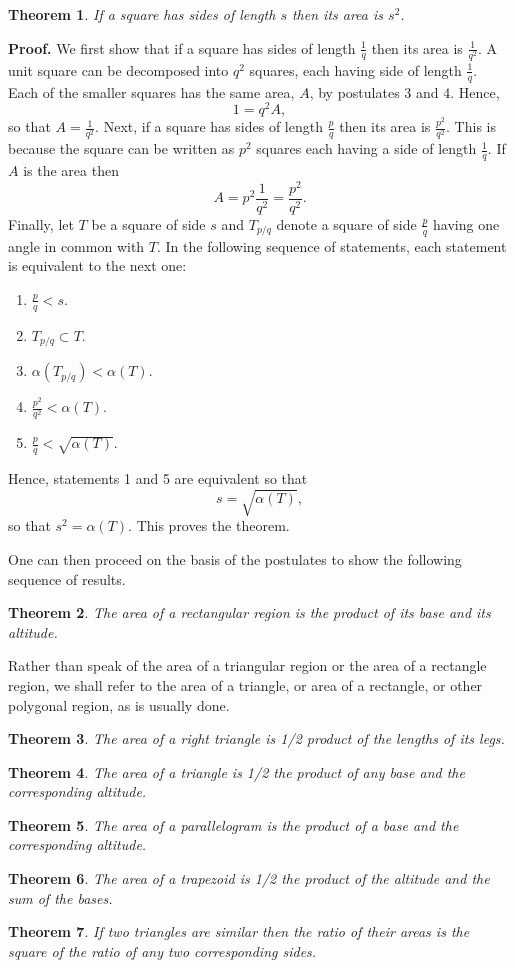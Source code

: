 \documentclass[12pt]{article}
\newtheorem{thm}{Theorem}
\begin{document}
\begin{thm}
If a square has sides of length $s$ then its area is $s^2$.
\end{thm}
\textbf{Proof.} We first show that if a square has sides of length $\frac{1}{q}$ then its area is
$\frac{1}{q^2}$. A unit square can be decomposed into $q^2$ squares, each having side of length
$\frac{1}{q}$. Each of the smaller squares has the same area, $A$,  by postulates 3 and 4. 
Hence,
$$
1 = q^2 A,
$$
so that $A = \frac{1}{q^2}$. Next, if a square has sides of length $\frac{p}{q}$ then its area
is $\frac{p^2}{q^2}$. This is because the square can be written as $p^2$ squares each having a side of length
$\frac{1}{q}$.  If $A$ is the area then
$$
A = p^2 \frac{1}{q^2} = \frac{p^2}{q^2}.
$$
Finally, let $T$ be a square of side $s$ and $T_{p/q}$ denote a square of side $\frac{p}{q}$ having
one angle in common with $T$. In the following sequence of statements, each statement 
is equivalent to the next one:
\begin{enumerate}
\item $\frac{p}{q} < s.$
\item $T_{p/q} \subset T.$ 
\item $\alpha(T_{p/q}) < \alpha(T).$
\item $\frac{p^2}{q^2} < \alpha(T).$
\item $\frac{p}{q} < \sqrt{\alpha(T)}.$
\end{enumerate}
 
Hence, statements 1 and 5 are equivalent so that 
$$
s = \sqrt{\alpha(T)},
$$
so that $s^2 = \alpha(T)$.
This proves the theorem.

One can then proceed on the basis of the postulates to show the following sequence of results.
\begin{thm}
The area of a rectangular region is the product of its base and its altitude.
\end{thm}

Rather than speak of the area of a triangular region or the area of a rectangle region,
we shall refer to the area of a triangle, or area of a rectangle, or other polygonal
region, as is usually done. 

\begin{thm} The area of a right triangle is 1/2 product of the lengths of its legs.
\end{thm}
\begin{thm}
The area of a triangle is 1/2 the product of any base and the corresponding altitude.
\end{thm}
\begin{thm}
The area of a parallelogram is the product of a base and the corresponding altitude.
\end{thm}
\begin{thm}
The area of a trapezoid is 1/2 the product of the altitude and the sum of the bases.
\end{thm}
\begin{thm}
If two triangles are similar then the ratio of their areas is the square of the ratio
of any two corresponding sides. 
\end{thm}
\end{document}
